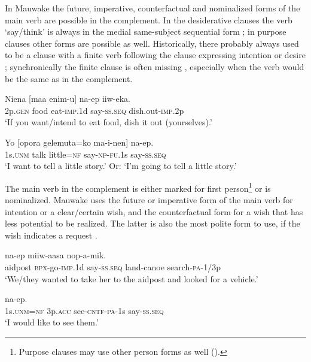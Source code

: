 In Mauwake the future, imperative, counterfactual and nominalized forms of the main verb are possible in the complement. In the desiderative clauses the verb  `say/think' is always in the medial same-subject sequential form ; in purpose clauses other forms are possible as well. Historically, there probably always used to be a clause with a finite verb following the clause expressing intention or desire ; synchronically the finite clause is often missing , especially when the verb would be the same as in the complement.

\ea%
\label{ex:8:x367}
\gll Niena  [maa  enim-u]  na-ep  iiw-eka. \\
2p.\textsc{gen} food eat-\textsc{imp}.1d say-\textsc{ss}.\textsc{seq} dish.out-\textsc{imp}.2p\\
\glt`If you want/intend to eat food, dish it out (yourselves).'
\z


\ea%
\label{ex:8:x368}
\gll Yo  [opora  gelemuta=ko  ma-i-nen]  na-ep.\\
1s.\textsc{unm} talk  little=\textsc{nf} say-\textsc{np}-\textsc{fu}.1s  say-\textsc{ss}.\textsc{seq}\\
\glt`I want to tell a little story.' Or: `I'm going to tell a little story.'
\z


The main verb in the complement is either marked for first person\footnote{Purpose clauses may use other person forms as well ().} or is nominalized. Mauwake uses the future  or imperative form  of the main verb for intention or a clear/certain wish, and the counterfactual form for a wish that has less potential to be realized. The latter is also the most polite form to use, if the wish indicates a request . 

\ea%
\label{ex:8:x369}
\gll [Haussik  p-ek-u]  na-ep  miiw-aasa  nop-a-mik.\\
aidpost \textsc{\textsc{bp}x}-go-\textsc{imp}.1d say-\textsc{ss}.\textsc{seq} land-canoe search-\textsc{pa}-1/3p\\
\glt`We/they wanted to take her to the aidpost and looked for a vehicle.'
\z


\ea%
\label{ex:8:x370}
\gll [Yo=ko  wia  uruf-ek-a-m] na-ep.\\
1s.\textsc{unm}=\textsc{nf} 3p.\textsc{acc} see-\textsc{cntf}-\textsc{pa}-1s say-\textsc{ss}.\textsc{seq}\\
\glt`I would like to see them.'
\z


